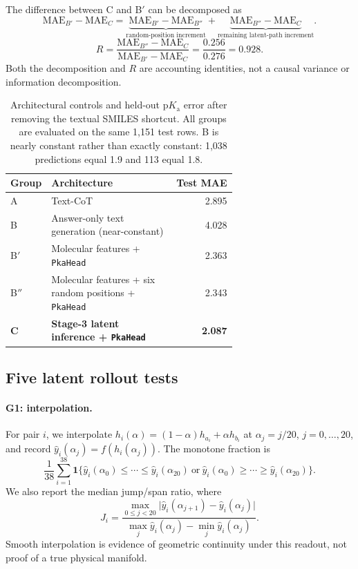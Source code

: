 \documentclass[11pt]{article}
\newcommand{\pka}{\mathrm{p}K_{\mathrm a}}
\newcommand{\MAE}{\mathrm{MAE}}
\begin{document}
The difference between C and B$'$ can be decomposed as
\begin{equation}
  \MAE_{B'}-\MAE_C
  = \underbrace{\MAE_{B'}-\MAE_{B''}}_{\text{random-position increment}}
  + \underbrace{\MAE_{B''}-\MAE_C}_{\text{remaining latent-path increment}} .
\end{equation}
\begin{equation}
  R=\frac{\MAE_{B''}-\MAE_C}{\MAE_{B'}-\MAE_C}
   =\frac{0.256}{0.276}=0.928 .
\end{equation}
Both the decomposition and $R$ are accounting identities, not a causal variance or information decomposition.

\begin{table}[t]
\centering
\caption{Architectural controls and held-out $\pka$ error after removing the textual SMILES shortcut. All groups are evaluated on the same 1{,}151 test rows. B is nearly constant rather than exactly constant: 1{,}038 predictions equal 1.9 and 113 equal 1.8.}
\label{tab:regression}
\small
\begin{tabular}{p{0.10\linewidth}p{0.55\linewidth}r}
\toprule
Group & Architecture & Test MAE \\
\midrule
A & Text-CoT & 2.895 \\
B & Answer-only text generation (near-constant) & 4.028 \\
B$'$ & Molecular features + \texttt{PkaHead} & 2.363 \\
B$''$ & Molecular features + six random positions + \texttt{PkaHead} & 2.343 \\
\textbf{C} & \textbf{Stage-3 latent inference + \texttt{PkaHead}} & \textbf{2.087} \\
\bottomrule
\end{tabular}
\end{table}

\subsection{Five latent rollout tests}

\paragraph{G1: interpolation.} For pair $i$, we interpolate
$h_i(\alpha)=(1-\alpha)h_{a_i}+\alpha h_{b_i}$ at $\alpha_j=j/20$, $j=0,\ldots,20$, and record $\hat y_i(\alpha_j)=f(h_i(\alpha_j))$. The monotone fraction is
\begin{equation}
  \frac1{38}\sum_{i=1}^{38}\mathbf 1\{\hat y_i(\alpha_0)\leq\cdots\leq\hat y_i(\alpha_{20})
  \ \text{or}\ \hat y_i(\alpha_0)\geq\cdots\geq\hat y_i(\alpha_{20})\}.
\end{equation}
We also report the median jump/span ratio, where
\begin{equation}
 J_i=\frac{\max_{0\leq j<20}\lvert\hat y_i(\alpha_{j+1})-\hat y_i(\alpha_j)\rvert}
 {\max_j\hat y_i(\alpha_j)-\min_j\hat y_i(\alpha_j)} .
\end{equation}
Smooth interpolation is evidence of geometric continuity under this readout, not proof of a true physical manifold.
\end{document}
